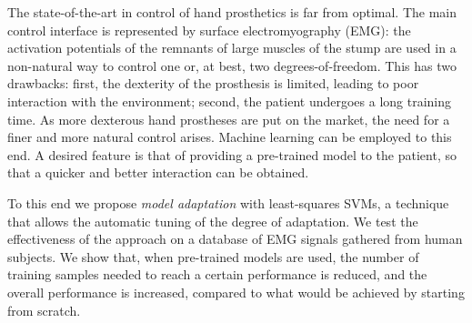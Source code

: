 The state-of-the-art in control of hand prosthetics is far from
optimal. The main control interface is represented by surface
electromyography (EMG): the activation potentials of the remnants of
large muscles of the stump are used in a non-natural way to control
one or, at best, two degrees-of-freedom. This has two drawbacks:
first, the dexterity of the prosthesis is limited, leading to poor
interaction with the environment; second, the patient undergoes a long
training time.
As more dexterous hand prostheses are put on the market, the need
for a finer and more natural control arises. Machine learning can be
employed to this end. A desired feature is that of providing a
pre-trained model to the patient, so that a quicker and better
interaction can be obtained.

To this end we propose \emph{model adaptation} with least-squares SVMs,
a technique that allows the automatic tuning of the degree of adaptation. We test the
effectiveness of the approach on a database of EMG signals gathered from human
subjects.
We show that, when pre-trained models are used, the number of training samples
needed to reach a certain performance is reduced, and the overall performance is
increased, compared to what would be achieved by starting from scratch.
